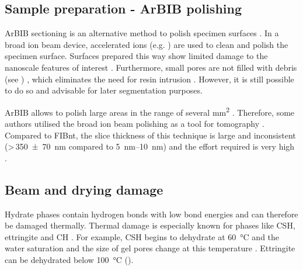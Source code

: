 \subsection{Sample preparation - \Acl*{ArBIB} polishing}

\Ac{ArBIB} sectioning is an alternative method to polish specimen surfaces \cite{harper.1983,grunewald.1987}.
In a broad ion beam device, accelerated ions (e.g. ) are used to clean and polish the specimen surface.
Surfaces prepared this way show limited damage to the nanoscale features of interest \cite{desbois.2009,desbois.2010}.
Furthermore, small pores are not filled with debris (see ) \cite{desbois.2009,desbois.2010}, which eliminates the need for resin intrusion \cite{desbois.2009}.
However, it is still possible to do so \cite{rossler.2017} and advisable for later segmentation purposes.

\Ac{ArBIB} allows to polish large areas in the range of several \unit{\milli\meter\squared} \cite{hauffe.2003,desbois.2013}.
Therefore, some authors utilised the broad ion beam polishing as a tool for tomography \cite{desbois.2013,mac.2018}.
Compared to \ac{FIBnt}, the slice thickness of this technique is large and inconsistent (>\,\qty{350(70)}{\nano\meter} compared to \qtyrange{5}{10}{\nano\meter}) and the effort required is very high \cite{desbois.2013}.


\subsection{Beam and drying damage}
\label{sec:beam_damage} 

Hydrate phases contain hydrogen bonds with low bond energies and can therefore be damaged thermally.
Thermal damage is especially known for phases like \ac{CSH}, ettringite and \ac{CH} \cite{lothenbach.2016}.
For example, \ac{CSH} begins to dehydrate at \qty{60}{\celsius} \cite{he.2018} and the water saturation and the size of gel pores change at this temperature \cite{gajewicz.2016}.
Ettringite can be dehydrated below \qty{100}{\celsius} ().

